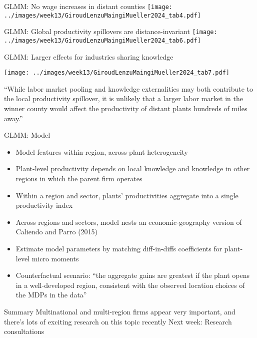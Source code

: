 \documentclass[11pt,notes=hide,aspectratio=169]{beamer}
\begin{document}
\begin{frame}{GLMM: No wage increases in distant counties}
\texttt{[image: ../images/week13/GiroudLenzuMaingiMueller2024\_tab4.pdf]}
	
\end{frame}
\begin{frame}{GLMM: Global productivity spillovers are distance-invariant}
\texttt{[image: ../images/week13/GiroudLenzuMaingiMueller2024\_tab6.pdf]}
\end{frame}
\begin{frame}{GLMM: Larger effects for industries sharing knowledge}
\begin{center}
\texttt{[image: ../images/week13/GiroudLenzuMaingiMueller2024\_tab7.pdf]}
\end{center}
\vspace{-2mm}
{\footnotesize ``While labor market pooling and knowledge externalities may both contribute to the local productivity spillover, it is unlikely that a larger labor market in the winner county would affect the productivity of distant plants hundreds of miles away.''\par}
\end{frame}
\begin{frame}{GLMM: Model}
\begin{itemize}
\item Model features within-region, across-plant heterogeneity
\item Plant-level productivity depends on local knowledge and knowledge in other regions in which the parent firm operates
\item Within a region and sector, plants' productivities aggregate into a single productivity index
\item Across regions and sectors, model nests an economic-geography version of Caliendo and Parro (2015)
\item Estimate model parameters by matching diff-in-diffs coefficients for plant-level micro moments
\item Counterfactual scenario: ``the aggregate gains are greatest if the plant opens in a well-developed region, consistent with the observed location choices of the MDPs in the data''
\end{itemize}
\end{frame}
\begin{frame}{Summary}
Multinational and multi-region firms appear very important, and there's lots of exciting research on this topic recently
\vspace{2cm}
Next week: Research consultations
\end{frame}
\end{document}
